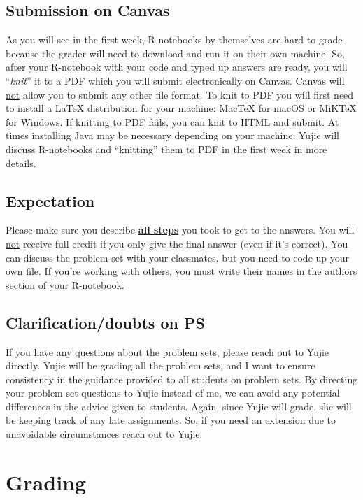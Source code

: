 \documentclass[11pt]{article}
\newcommand{\TAShort}{Yujie}
\newcommand{\TAthey}{she}                            %
\newcommand{\ul}[1]{\underline{#1}}
\begin{document}
\subsection{Submission on Canvas}
As you will see in the first week, R-notebooks by themselves are hard to grade
because the grader will need to download and run it on their own machine. So,
after your R-notebook with your code and typed up answers are ready, you will
``\emph{knit}'' it to a PDF which you will submit electronically on Canvas.
Canvas will \ul{not} allow you to submit any other file format. To knit to PDF
you will first need to install a \LaTeX{} distribution for your machine: MacTeX
for macOS or MiKTeX for Windows. If knitting to PDF fails, you can knit to HTML
and submit. At times installing Java may be necessary depending on your machine.
\TAShort{} will discuss R-notebooks and ``knitting'' them to PDF in the first
week in more details.

\subsection{Expectation}
Please make sure you describe \textbf{\ul{all steps}} you took to get to the
answers. You will \ul{not} receive full credit if you only give the final answer
(even if it's correct). You can discuss the problem set with your classmates, but
you need to code up your own file. If you're working with others, you must write
their names in the authors section of your R-notebook.

\subsection{Clarification/doubts on PS}
If you have any questions about the problem sets, please reach out to \TAShort{}
directly. \TAShort{} will be grading all the problem sets, and I want to ensure
consistency in the guidance provided to all students on problem sets. By
directing your problem set questions to \TAShort{} instead of me, we can avoid
any potential differences in the advice given to students. Again, since
\TAShort{} will grade, \TAthey{} will be keeping track of any late assignments.
So, if you need an extension due to unavoidable circumstances reach out to
\TAShort.

\section{Grading}
\end{document}
